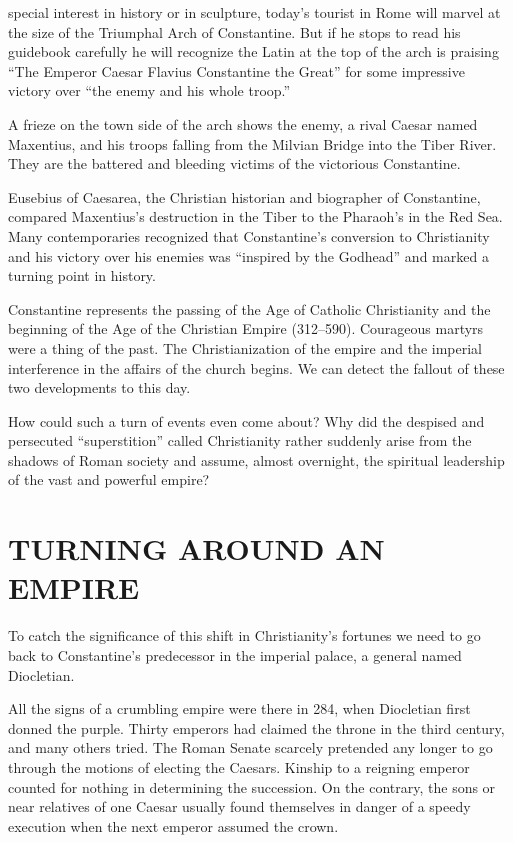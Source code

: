 
 special interest in history or in sculpture, today’s tourist in Rome
will marvel at the size of the Triumphal Arch of Constantine. But if he stops to read his guidebook
carefully he will recognize the Latin at the top of the arch is praising “The Emperor Caesar Flavius
Constantine the Great” for some impressive victory over “the enemy and his whole troop.”

A frieze on the town side of the arch shows the enemy, a rival Caesar named Maxentius, and his
troops falling from the Milvian Bridge into the Tiber River. They are the battered and bleeding
victims of the victorious Constantine.

Eusebius of Caesarea, the Christian historian and biographer of Constantine, compared Maxentius’s
destruction in the Tiber to the Pharaoh’s in the Red Sea. Many contemporaries recognized that
Constantine’s conversion to Christianity and his victory over his enemies was “inspired by the
Godhead” and marked a turning point in history.

Constantine represents the passing of the Age of Catholic Christianity and the beginning of the Age
of the Christian Empire (312–590). Courageous martyrs were a thing of the past. The Christianization
of the empire and the imperial interference in the affairs of the church begins. We can detect the
fallout of these two developments to this day.

How could such a turn of events even come about? Why did the despised and persecuted “superstition”
called Christianity rather suddenly arise from the shadows of Roman society and assume, almost
overnight, the spiritual leadership of the vast and powerful empire?

\section{TURNING AROUND AN EMPIRE}

To catch the significance of this shift in Christianity’s fortunes we need to go back to
Constantine’s predecessor in the imperial palace, a general named Diocletian.

All the signs of a crumbling empire were there in 284, when Diocletian first donned the purple.
Thirty emperors had claimed the throne in the third century, and many others tried. The Roman Senate
scarcely pretended any longer to go through the motions of electing the Caesars. Kinship to a
reigning emperor counted for nothing in determining the succession. On the contrary, the sons or
near relatives of one Caesar usually found themselves in danger of a speedy execution when the next
emperor assumed the crown.

